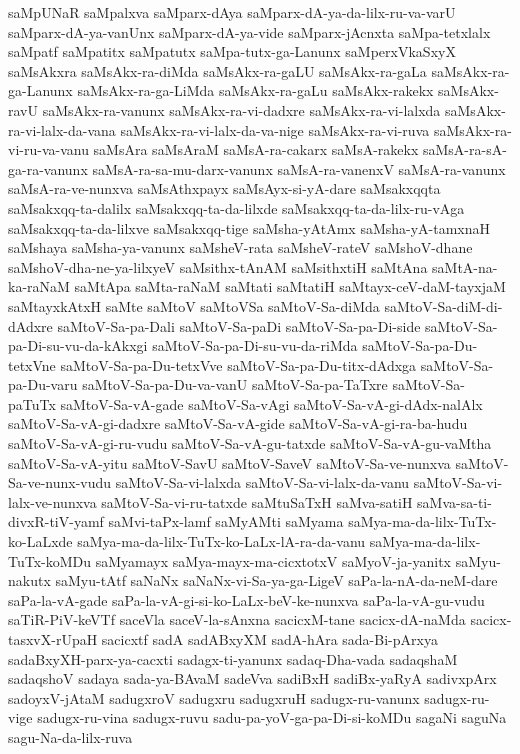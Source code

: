 {saMpUNaR
saMpalxva
saMparx-dAya
saMparx-dA-ya-da-lilx-ru-va-varU
saMparx-dA-ya-vanUnx
saMparx-dA-ya-vide
saMparx-jAcnxta
saMpa-tetxlalx
saMpatf
saMpatitx
saMpatutx
saMpa-tutx-ga-Lanunx
saMperxVkaSxyX
saMsAkxra
saMsAkx-ra-diMda
saMsAkx-ra-gaLU
saMsAkx-ra-gaLa
saMsAkx-ra-ga-Lanunx
saMsAkx-ra-ga-LiMda
saMsAkx-ra-gaLu
saMsAkx-rakekx
saMsAkx-ravU
saMsAkx-ra-vanunx
saMsAkx-ra-vi-dadxre
saMsAkx-ra-vi-lalxda
saMsAkx-ra-vi-lalx-da-vana
saMsAkx-ra-vi-lalx-da-va-nige
saMsAkx-ra-vi-ruva
saMsAkx-ra-vi-ru-va-vanu
saMsAra
saMsAraM
saMsA-ra-cakarx
saMsA-rakekx
saMsA-ra-sA-ga-ra-vanunx
saMsA-ra-sa-mu-darx-vanunx
saMsA-ra-vanenxV
saMsA-ra-vanunx
saMsA-ra-ve-nunxva
saMsAthxpayx
saMsAyx-si-yA-dare
saMsakxqqta
saMsakxqq-ta-dalilx
saMsakxqq-ta-da-lilxde
saMsakxqq-ta-da-lilx-ru-vAga
saMsakxqq-ta-da-lilxve
saMsakxqq-tige
saMsha-yAtAmx
saMsha-yA-tamxnaH
saMshaya
saMsha-ya-vanunx
saMsheV-rata
saMsheV-rateV
saMshoV-dhane
saMshoV-dha-ne-ya-lilxyeV
saMsithx-tAnAM
saMsithxtiH
saMtAna
saMtA-na-ka-raNaM
saMtApa
saMta-raNaM
saMtati
saMtatiH
saMtayx-ceV-daM-tayxjaM
saMtayxkAtxH
saMte
saMtoV
saMtoVSa
saMtoV-Sa-diMda
saMtoV-Sa-diM-di-dAdxre
saMtoV-Sa-pa-Dali
saMtoV-Sa-paDi
saMtoV-Sa-pa-Di-side
saMtoV-Sa-pa-Di-su-vu-da-kAkxgi
saMtoV-Sa-pa-Di-su-vu-da-riMda
saMtoV-Sa-pa-Du-tetxVne
saMtoV-Sa-pa-Du-tetxVve
saMtoV-Sa-pa-Du-titx-dAdxga
saMtoV-Sa-pa-Du-varu
saMtoV-Sa-pa-Du-va-vanU
saMtoV-Sa-pa-TaTxre
saMtoV-Sa-paTuTx
saMtoV-Sa-vA-gade
saMtoV-Sa-vAgi
saMtoV-Sa-vA-gi-dAdx-nalAlx
saMtoV-Sa-vA-gi-dadxre
saMtoV-Sa-vA-gide
saMtoV-Sa-vA-gi-ra-ba-hudu
saMtoV-Sa-vA-gi-ru-vudu
saMtoV-Sa-vA-gu-tatxde
saMtoV-Sa-vA-gu-vaMtha
saMtoV-Sa-vA-yitu
saMtoV-SavU
saMtoV-SaveV
saMtoV-Sa-ve-nunxva
saMtoV-Sa-ve-nunx-vudu
saMtoV-Sa-vi-lalxda
saMtoV-Sa-vi-lalx-da-vanu
saMtoV-Sa-vi-lalx-ve-nunxva
saMtoV-Sa-vi-ru-tatxde
saMtuSaTxH
saMva-satiH
saMva-sa-ti-divxR-tiV-yamf
saMvi-taPx-lamf
saMyAMti
saMyama
saMya-ma-da-lilx-TuTx-ko-LaLxde
saMya-ma-da-lilx-TuTx-ko-LaLx-lA-ra-da-vanu
saMya-ma-da-lilx-TuTx-koMDu
saMyamayx
saMya-mayx-ma-cicxtotxV
saMyoV-ja-yanitx
saMyu-nakutx
saMyu-tAtf
saNaNx
saNaNx-vi-Sa-ya-ga-LigeV
saPa-la-nA-da-neM-dare
saPa-la-vA-gade
saPa-la-vA-gi-si-ko-LaLx-beV-ke-nunxva
saPa-la-vA-gu-vudu
saTiR-PiV-keVTf
saceVla
saceV-la-sAnxna
sacicxM-tane
sacicx-dA-naMda
sacicx-tasxvX-rUpaH
sacicxtf
sadA
sadABxyXM
sadA-hAra
sada-Bi-pArxya
sadaBxyXH-parx-ya-cacxti
sadagx-ti-yanunx
sadaq-Dha-vada
sadaqshaM
sadaqshoV
sadaya
sada-ya-BAvaM
sadeVva
sadiBxH
sadiBx-yaRyA
sadivxpArx
sadoyxV-jAtaM
sadugxroV
sadugxru
sadugxruH
sadugx-ru-vanunx
sadugx-ru-vige
sadugx-ru-vina
sadugx-ruvu
sadu-pa-yoV-ga-pa-Di-si-koMDu
sagaNi
saguNa
sagu-Na-da-lilx-ruva
}

